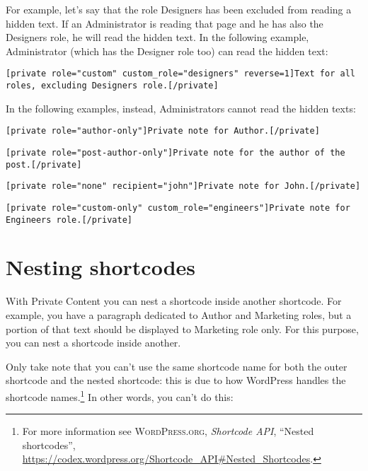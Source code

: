 For example, let's say that the role Designers has been excluded from reading a
hidden text. If an Administrator is reading that page and he has also the
Designers role, he will read the hidden text. In the following example,
Administrator (which has the Designer role too) can read the hidden text:

\begin{lstlisting}
[private role="custom" custom_role="designers" reverse=1]Text for all roles, excluding Designers role.[/private]
\end{lstlisting}

In the following examples, instead, Administrators cannot read the hidden texts:

\begin{lstlisting}
[private role="author-only"]Private note for Author.[/private]
\end{lstlisting}

\begin{lstlisting}
[private role="post-author-only"]Private note for the author of the post.[/private]
\end{lstlisting}

\begin{lstlisting}
[private role="none" recipient="john"]Private note for John.[/private]
\end{lstlisting}

\begin{lstlisting}
[private role="custom-only" custom_role="engineers"]Private note for Engineers role.[/private]
\end{lstlisting}

\chapter{Nesting shortcodes}

With Private Content you can nest a shortcode inside another shortcode. For
example, you have a paragraph dedicated to Author and Marketing roles, but a
portion of that text should be displayed to Marketing role only. For this
purpose, you can nest a shortcode inside another.

Only take note that you can't use the same shortcode name for both the outer
shortcode and the nested shortcode: this is due to how WordPress handles the
shortcode names.\footnote{For more information see \textsc{WordPress.org},
\textit{Shortcode API}, ``Nested shortcodes'',
\url{https://codex.wordpress.org/Shortcode_API\#Nested_Shortcodes}.}
In other words, you can't do this:

